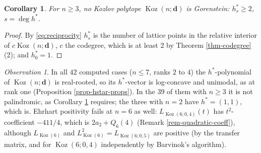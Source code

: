 \documentclass[11pt, a4paper, abstract=yes]{scrartcl}
\theoremstyle{definition}
\theoremstyle{remark}
\theoremstyle{plain}
\newtheorem{corollary}[definition]{Corollary}
\newcommand{\vek}[1]{\boldsymbol{#1}}
\theoremstyle{remark}
\newtheorem{observation}[definition]{Observation}
\theoremstyle{plain}
\newcommand{\Koz}{\operatorname{Koz}}
\newcommand{\leannone}{\tikz[baseline=-0.6ex]\draw[leannone,line width=0.6pt] (0,0) circle (0.55ex);}
\newcommand{\leanmark}[1]{\leavevmode{\reversemarginpar\marginnote{\raggedleft#1}}}
\begin{document}
\begin{corollary}
\leanmark{\leannone}For \(n\ge3\), no Kozlov polytope \(\Koz(n;\vek d)\) is Gorenstein: \(h^*_s\ge2\), \(s=\deg h^*\).
\label{cor-gorenstein}
\end{corollary}

\begin{proof}
By \eqref{eq:reciprocity} \(h^*_s\) is the number of lattice points in the relative interior of
\(c\Koz(n;\vek d)\), \(c\) the codegree, which is at least \(2\) by Theorem \ref{thm-codegree}(2); and
\(h^*_0=1\).
\end{proof}

\begin{observation}
In all \(42\) computed cases (\(n\le7\), ranks \(2\) to \(4\)) the \(h^*\)-polynomial of \(\Koz(n;\vek d)\)
is real-rooted, so its \(h^*\)-vector is log-concave and unimodal, as at rank one (Proposition
\ref{prop-hstar-props}). In the \(39\) of them with \(n\ge3\) it is not palindromic, as Corollary \ref{cor-gorenstein} requires;
the three with \(n=2\) have \(h^*=(1,1)\), which is. Ehrhart
positivity fails at \(n=6\) as well: \(L_{\Koz(6;0,4)}(t)\) has \(t^2\)-coefficient \(-411/4\), which is \(2a_2+Q_6(4)\)
(Remark \ref{rem-quadratic-coeff}), although
\(L_{\Koz(6)}\) and \(L_{\Koz(6)}^2=L_{\Koz(6;0,5)}\) are positive (by the transfer matrix, and for
\(\Koz(6;0,4)\) independently by Barvinok's algorithm).
\label{obs-hstar-unimodal}
\end{observation}
\end{document}
